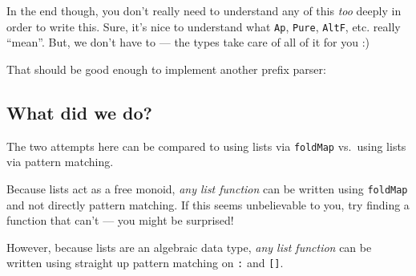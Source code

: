 \documentclass[]{article}
\newenvironment{Shaded}{}{}
\newcommand{\DataTypeTok}[1]{\textcolor[rgb]{0.56,0.13,0.00}{#1}}
\newcommand{\DecValTok}[1]{\textcolor[rgb]{0.25,0.63,0.44}{#1}}
\newcommand{\FunctionTok}[1]{\textcolor[rgb]{0.02,0.16,0.49}{#1}}
\newcommand{\NormalTok}[1]{#1}
\newcommand{\OperatorTok}[1]{\textcolor[rgb]{0.40,0.40,0.40}{#1}}
\newcommand{\StringTok}[1]{\textcolor[rgb]{0.25,0.44,0.63}{#1}}
\begin{document}
In the end though, you don't really need to understand any of this \emph{too}
deeply in order to write this. Sure, it's nice to understand what \texttt{Ap},
\texttt{Pure}, \texttt{AltF}, etc. really ``mean''. But, we don't have to ---
the types take care of all of it for you :)

That should be good enough to implement another prefix parser:

\begin{Shaded}
\end{Shaded}

\hypertarget{what-did-we-do}{%
\subsection{What did we do?}\label{what-did-we-do}}

The two attempts here can be compared to using lists via \texttt{foldMap}
vs.~using lists via pattern matching.

Because lists act as a free monoid, \emph{any list function} can be written
using \texttt{foldMap} and not directly pattern matching. If this seems
unbelievable to you, try finding a function that can't --- you might be
surprised!

However, because lists are an algebraic data type, \emph{any list function} can
be written using straight up pattern matching on \texttt{:} and \texttt{{[}{]}}.
\end{document}
